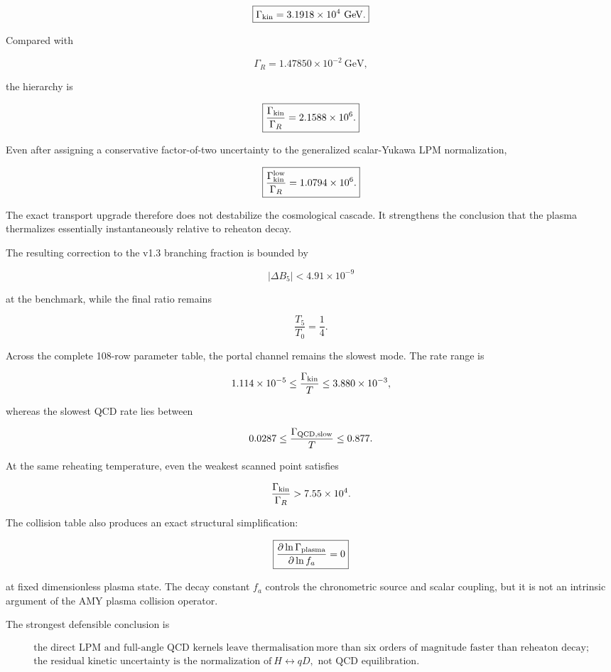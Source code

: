 \documentclass[
  10pt,
]{article}
\begin{document}
\[
\boxed{
\Gamma_{\rm kin}=3.1918\times10^4\ \mathrm{GeV}.
}
\]

Compared with

\[
\Gamma_R=1.47850\times10^{-2}\ \mathrm{GeV},
\]

the hierarchy is

\[
\boxed{
\frac{\Gamma_{\rm kin}}{\Gamma_R}
=2.1588\times10^6.
}
\]

Even after assigning a conservative factor-of-two uncertainty to the
generalized scalar-Yukawa LPM normalization,

\[
\boxed{
\frac{\Gamma_{\rm kin}^{\rm low}}{\Gamma_R}
=1.0794\times10^6.
}
\]

The exact transport upgrade therefore does not destabilize the
cosmological cascade. It strengthens the conclusion that the plasma
thermalizes essentially instantaneously relative to reheaton decay.

The resulting correction to the v1.3 branching fraction is bounded by

\[
\boxed{
|\Delta B_5|<4.91\times10^{-9}
}
\]

at the benchmark, while the final ratio remains

\[
\boxed{
\frac{T_5}{T_0}=\frac14.
}
\]

Across the complete 108-row parameter table, the portal channel remains
the slowest mode. The rate range is

\[
1.114\times10^{-5}
\leq
\frac{\Gamma_{\rm kin}}{T}
\leq
3.880\times10^{-3},
\]

whereas the slowest QCD rate lies between

\[
0.0287
\leq
\frac{\Gamma_{\rm QCD,slow}}{T}
\leq
0.877.
\]

At the same reheating temperature, even the weakest scanned point
satisfies

\[
\frac{\Gamma_{\rm kin}}{\Gamma_R}>7.55\times10^4.
\]

The collision table also produces an exact structural simplification:

\[
\boxed{
\frac{\partial\ln\Gamma_{\rm plasma}}
{\partial\ln f_a}=0
}
\]

at fixed dimensionless plasma state. The decay constant \(f_a\) controls
the chronometric source and scalar coupling, but it is not an intrinsic
argument of the AMY plasma collision operator.

The strongest defensible conclusion is

\[
\boxed{
\begin{gathered}
\text{the direct LPM and full-angle QCD kernels leave thermalisation}\
\text{more than six orders of magnitude faster than reheaton decay;}\\
\text{the residual kinetic uncertainty is the normalization of}\
H\leftrightarrow qD,\text{ not QCD equilibration.}
\end{gathered}
}
\]
\end{document}
